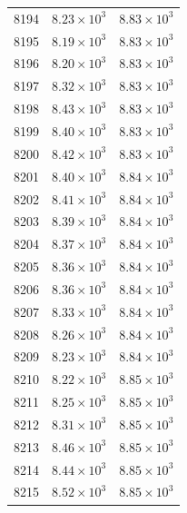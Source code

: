 \begin{table}[H]
\begin{tabular}{lll}
8194 & $\displaystyle 8.23 \times 10^{3}$ & $\displaystyle 8.83 \times 10^{3}$ \\
8195 & $\displaystyle 8.19 \times 10^{3}$ & $\displaystyle 8.83 \times 10^{3}$ \\
8196 & $\displaystyle 8.20 \times 10^{3}$ & $\displaystyle 8.83 \times 10^{3}$ \\
8197 & $\displaystyle 8.32 \times 10^{3}$ & $\displaystyle 8.83 \times 10^{3}$ \\
8198 & $\displaystyle 8.43 \times 10^{3}$ & $\displaystyle 8.83 \times 10^{3}$ \\
8199 & $\displaystyle 8.40 \times 10^{3}$ & $\displaystyle 8.83 \times 10^{3}$ \\
8200 & $\displaystyle 8.42 \times 10^{3}$ & $\displaystyle 8.83 \times 10^{3}$ \\
8201 & $\displaystyle 8.40 \times 10^{3}$ & $\displaystyle 8.84 \times 10^{3}$ \\
8202 & $\displaystyle 8.41 \times 10^{3}$ & $\displaystyle 8.84 \times 10^{3}$ \\
8203 & $\displaystyle 8.39 \times 10^{3}$ & $\displaystyle 8.84 \times 10^{3}$ \\
8204 & $\displaystyle 8.37 \times 10^{3}$ & $\displaystyle 8.84 \times 10^{3}$ \\
8205 & $\displaystyle 8.36 \times 10^{3}$ & $\displaystyle 8.84 \times 10^{3}$ \\
8206 & $\displaystyle 8.36 \times 10^{3}$ & $\displaystyle 8.84 \times 10^{3}$ \\
8207 & $\displaystyle 8.33 \times 10^{3}$ & $\displaystyle 8.84 \times 10^{3}$ \\
8208 & $\displaystyle 8.26 \times 10^{3}$ & $\displaystyle 8.84 \times 10^{3}$ \\
8209 & $\displaystyle 8.23 \times 10^{3}$ & $\displaystyle 8.84 \times 10^{3}$ \\
8210 & $\displaystyle 8.22 \times 10^{3}$ & $\displaystyle 8.85 \times 10^{3}$ \\
8211 & $\displaystyle 8.25 \times 10^{3}$ & $\displaystyle 8.85 \times 10^{3}$ \\
8212 & $\displaystyle 8.31 \times 10^{3}$ & $\displaystyle 8.85 \times 10^{3}$ \\
8213 & $\displaystyle 8.46 \times 10^{3}$ & $\displaystyle 8.85 \times 10^{3}$ \\
8214 & $\displaystyle 8.44 \times 10^{3}$ & $\displaystyle 8.85 \times 10^{3}$ \\
8215 & $\displaystyle 8.52 \times 10^{3}$ & $\displaystyle 8.85 \times 10^{3}$ \\

\end{tabular}
\end{table}
